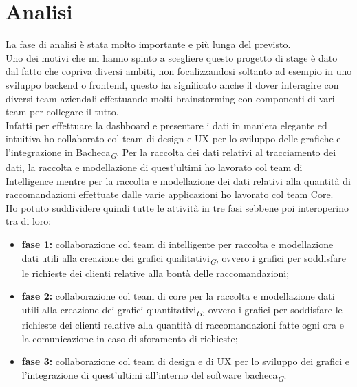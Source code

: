 \documentclass[a4paper, 12pt, twoside, openright]{book}
\newcommand{\gloss}[1]{#1\textsubscript{\textit{\tiny{G}}}}
\begin{document}
\section{Analisi}
La fase di analisi è stata molto importante e più lunga del previsto.\\
Uno dei motivi che mi hanno spinto a scegliere questo progetto di stage è dato dal fatto che copriva diversi ambiti, non focalizzandosi soltanto ad esempio in uno sviluppo backend o frontend, questo ha significato anche il dover interagire con diversi team aziendali effettuando molti brainstorming con componenti di vari team per collegare il tutto.\\
Infatti per effettuare la dashboard e presentare i dati in maniera elegante ed intuitiva ho collaborato col team di design e UX per lo sviluppo delle grafiche e l'integrazione in \gloss{Bacheca}. Per la raccolta dei dati relativi al tracciamento dei dati, la raccolta e modellazione di quest'ultimi ho lavorato col team di Intelligence mentre per la raccolta e modellazione dei dati relativi alla quantità di raccomandazioni effettuate dalle varie applicazioni ho lavorato col team Core.\\
Ho potuto suddividere quindi tutte le attività in tre fasi sebbene poi interoperino tra di loro:
\begin{itemize}
\item \textbf{fase 1:} collaborazione col team di intelligente per raccolta e modellazione dati utili alla creazione dei \gloss{grafici qualitativi}, ovvero i grafici per soddisfare le richieste dei clienti relative alla bontà delle raccomandazioni;
\item \textbf{fase 2:} collaborazione col team di core per la raccolta e modellazione dati utili alla creazione dei \gloss{grafici quantitativi}, ovvero i grafici per soddisfare le richieste dei clienti relative alla quantità di raccomandazioni fatte ogni ora e la comunicazione in caso di sforamento di richieste;
\item \textbf{fase 3:} collaborazione col team di design e di UX per lo sviluppo dei grafici e l'integrazione di quest'ultimi all'interno del software \gloss{bacheca}.
\end{itemize}
\end{document}
